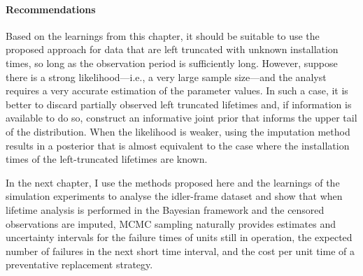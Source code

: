 \paragraph*{Recommendations}
Based on the learnings from this chapter, it should be suitable to use the proposed approach for data that are left truncated with unknown installation times, so long as the observation period is sufficiently long. However, suppose there is a strong likelihood---i.e., a very large sample size---and the analyst requires a very accurate estimation of the parameter values. In such a case, it is better to discard partially observed left truncated lifetimes and, if information is available to do so, construct an informative joint prior that informs the upper tail of the distribution. When the likelihood is weaker, using the imputation method results in a posterior that is almost equivalent to the case where the installation times of the left-truncated lifetimes are known.

In the next chapter, I use the methods proposed here and the learnings of the simulation experiments to analyse the idler-frame dataset and show that when lifetime analysis is performed in the Bayesian framework and the censored observations are imputed, MCMC sampling naturally provides estimates and uncertainty intervals for the failure times of units still in operation, the expected number of failures in the next short time interval, and the cost per unit time of a preventative replacement strategy.